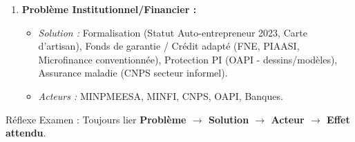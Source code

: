 \documentclass[11pt]{article}
\newcommand{\cle}[1]{{\popxbold\color{popdark}#1}}
\begin{document}
\begin{methode}
\begin{enumerate}
\begin{itemize}
    \end{itemize}
    \item \textbf{Problème Institutionnel/Financier :} 
    \begin{itemize}
        \item \textit{Solution :} \cle{Formalisation} (Statut Auto-entrepreneur 2023, Carte d'artisan), \cle{Fonds de garantie} / \cle{Crédit adapté} (FNE, PIAASI, Microfinance conventionnée), \cle{Protection PI} (OAPI - dessins/modèles), \cle{Assurance maladie} (CNPS secteur informel).
        \item \textit{Acteurs :} MINPMEESA, MINFI, CNPS, OAPI, Banques.
    \end{itemize}
\end{enumerate}
\cle{Réflexe Examen :} Toujours lier \textbf{Problème $\rightarrow$ Solution $\rightarrow$ Acteur $\rightarrow$ Effet attendu}.
\end{methode}
\end{document}
